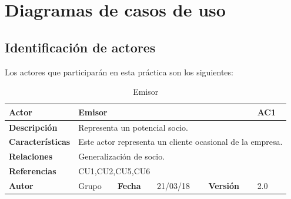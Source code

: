 \documentclass[12pt,spanish]{article}
\begin{document}
\section{Diagramas de casos de uso}

\subsection{Identificación de actores}
Los actores que participarán en esta práctica son los siguientes:

\begin{table}[H]

\centering
\begin{tabular}{|m{3cm}|m{4cm}|m{2cm}|m{2cm}|m{2cm}|m{1cm}|}
\hline
\textbf{Actor} &  \multicolumn{4}{m{8cm}|}{Emisor} \vline &  \cellcolor{gray!40}AC1 \\
\hline
\textbf{Descripción} & \multicolumn{5}{m{8cm}|}{Representa un potencial socio.} \\
\hline
\textbf{Características} & \multicolumn{5}{m{8cm}|}{Este actor representa un cliente ocasional de la empresa.} \\
\hline
\textbf{Relaciones} &\multicolumn{5}{m{8cm}|}{Generalización de socio.} \\
\hline
\textbf{Referencias} & \multicolumn{5}{m{8cm}|}{CU1,CU2,CU5,CU6} \\
\hline
\textbf{Autor} & Grupo & \textbf{Fecha} & 21/03/18 & \textbf{Versión} & 2.0 \\
\hline
\end{tabular}
\caption{Emisor}

\end{table}
\end{document}
